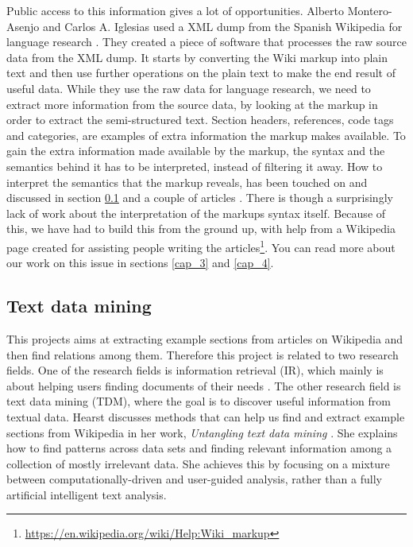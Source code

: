 Public access to this information gives a lot of opportunities. Alberto Montero-Asenjo and Carlos A. Iglesias used a XML dump from the Spanish Wikipedia for language research \cite{lr-wiki}. They created a piece of software that processes the raw source data from the XML dump. It starts by converting the Wiki markup into plain text and then use further operations on the plain text to make the end result of useful data. While they use the raw data for language research, we need to extract more information from the source data, by looking at the markup in order to extract the semi-structured text. Section headers, references, code tags and categories, are examples of extra information the markup makes available. 
To gain the extra information made available by the markup, the syntax and the semantics behind it has to be interpreted, instead of filtering it away.
How to interpret the semantics that the markup reveals, has been touched on and discussed in section \ref{sec_tdm} and a couple of articles \cite{text-cat} \cite{wlm}. There is though a surprisingly lack of work about the interpretation of the markups syntax itself. Because of this, we have had to build this from the ground up, with help from a Wikipedia page created for assisting people writing the articles\footnote{\url{https://en.wikipedia.org/wiki/Help:Wiki_markup}}. You can read more about our work on this issue in sections \ref{cap_3} and \ref{cap_4}.

\subsection{Text data mining} \label{sec_tdm}
This projects aims at extracting example sections from articles on Wikipedia and then find relations among them. Therefore this project is related to two research fields. One of the research fields is information retrieval (IR), which mainly is about helping users finding documents of their needs \cite{irbook}. The other research field is text data mining (TDM), where the goal is to discover useful information from textual data. Hearst discusses methods that can help us find and extract example sections from Wikipedia in her work, \textit{Untangling text data mining} \cite{untanglingTDM}. She explains how to find patterns across data sets and finding relevant information among a collection of mostly irrelevant data. She achieves this by focusing on a mixture between computationally-driven and user-guided analysis, rather than a fully artificial intelligent text analysis.


